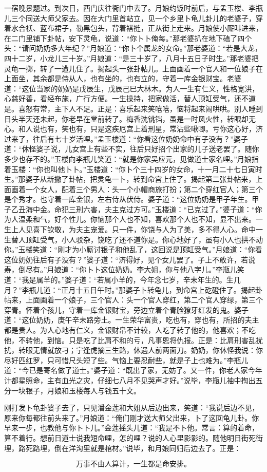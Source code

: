 一宿晚景题过。到次日，西门庆往衙门中去了。月娘约饭时前后，与孟玉楼、李瓶儿三个同送大师父家去。因在大门里首站立，见一个乡里卜龟儿卦儿的老婆子，穿着水合袄、蓝布裙子，勒黑包头，背着褡裢，正从街上走来。月娘使小厮叫进来，在二门里铺下卦帖，安下灵龟，说道：“你卜卜俺每。”那老婆扒在地下磕了四个头：“请问奶奶多大年纪？”月娘道：“你卜个属龙的女命。”那老婆道：“若是大龙，四十二岁，小龙儿三十岁。”月娘道：“是三十岁了，八月十五日子时生。”那老婆把灵龟一掷，转了一遭儿住了。揭起头一张卦帖儿。上面画着一个官人和一位娘子在上面坐，其余都是侍从人，也有坐的，也有立的，守着一库金银财宝。老婆道：“这位当家的奶奶是戊辰生，戊辰己巳大林木。为人一生有仁义，性格宽洪，心慈好善，看经布施，广行方便。一生操持，把家做活，替人顶缸受气，还不道是。喜怒有常，主下人不足。正是：喜乐起来笑嘻嘻，恼将起来闹哄哄。别人睡到日头半天还未起，你老早在堂前转了。梅香洗铫铛，虽是一时风火性，转眼却无心。和人说也有，笑也有，只是这疾厄宫上着刑星，常沾些啾唧。亏你这心好，济过来了，往后有七十岁活哩。”孟玉楼道：“你看这位奶奶命中有子没有？”婆子道：“休怪婆子说，儿女宫上有些不实，往后只好招个出家的儿子送老罢了。随你多少也存不的。”玉楼向李瓶儿笑道：“就是你家吴应元，见做道士家名哩。”月娘指着玉楼：“你也叫他卜卜。”玉楼道：“你卜个三十四岁的女命，十一月二十七日寅时生。”那婆子从新撇了卦帖，把灵龟一卜，转到命宫上住了。揭起第二张卦帖来，上面画着一个女人，配着三个男人：头一个小帽商旅打扮；第二个穿红官人；第三个是个秀才。也守着一库金银，左右侍从伏侍。婆子道：“这位奶奶是甲子年生。甲子乙丑海中金。命犯三刑六害，夫主克过方可。”玉楼道：“已克过了。”婆子道：“你为人温柔和气，好个性儿。你恼那个人也不知，喜欢那个人也不知，显不出来。一生上人见喜下钦敬，为夫主宠爱。只一件，你饶与人为了美，多不得人心。命中一生替人顶缸受气，小人驳杂，饶吃了还不道你是。你心地好了，虽有小人也拱不动你。”玉楼笑道：“刚才为小厮讨银子和他乱了，这回说是顶缸受气。”月娘道：“你看这位奶奶往后有子没有？”婆子道：“济得好，见个女儿罢了。子上不敢许，若说寿，倒尽有。”月娘道：“你卜卜这位奶奶。李大姐，你与他八字儿。”李瓶儿笑道：“我是属羊的。”婆子道：“若属小羊的，今年念七岁，辛未年生的。生几月？”李瓶儿道：“正月十五日午时。”那婆子卜转龟儿，到命宫上矻磴住了。揭起卦帖来，上面画着一个娘子，三个官人：头一个官人穿红，第二个官人穿绿，第三个穿青。怀着个孩儿，守着一库金银财宝，旁边立着个青脸獠牙红发的鬼。婆子道：“这位奶奶，庚午辛未路旁土。一生荣华富贵，吃也有，穿也有，所招的夫主都是贵人。为人心地有仁义，金银财帛不计较，人吃了转了他的，他喜欢；不吃他，不转他，到恼。只是吃了比肩不和的亏，凡事恩将仇报。正是：比肩刑害乱扰扰，转眼无情就放刁；宁逢虎摘三生路，休遇人前两面刀。奶奶，你休怪我说：你尽好匹红罗，只可惜尺头短了些。气恼上要忍耐些，就是子上也难为。”李瓶儿道：“今已是寄名做了道士。”婆子道：“既出了家，无妨了。又一件，你老人家今年计都星照命，主有血光之灾，仔细七八月不见哭声才好。”说毕，李瓶儿袖中掏出五分一块银子，月娘和玉楼每人与钱五十文。

刚打发卜龟卦婆子去了，只见潘金莲和大姐从后边出来，笑道：“我说后边不见，原来你每都往前头来了。”月娘道：“俺们刚才送大师父出来，卜了这回龟儿卦。你早来一步，也教他与你卜卜儿。”金莲摇头儿道：“我是不卜他。常言：算的着命，算不着行。想前日道士说我短命哩，怎的哩？说的人心里影影的。随他明日街死街埋，路死路埋，倒在洋沟里就是棺材。”说毕，和月娘同归后边去了。正是：

\[
万事不由人算计，一生都是命安排。
\]
